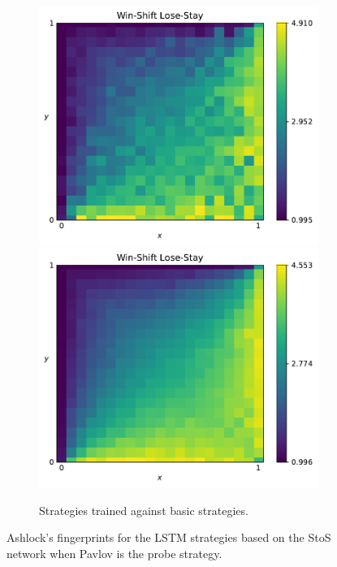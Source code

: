\begin{figure}[!htbp]
\begin{subfigure}{\textwidth}
        \includegraphics[width=.3\textwidth]{src/chapters/07/img/win_shift_lose_stay_basic_sequence_1.pdf}
        \includegraphics[width=.3\textwidth]{src/chapters/07/img/win_shift_lose_stay_basic_sequence_0_78.pdf}
        \caption{Strategies trained against basic strategies.}
    \end{subfigure}
    \caption{Ashlock's fingerprints for the LSTM strategies based on the StoS
    network when Pavlov is the probe strategy.}\label{fig:ashlock_fingerprints_pavlov_s_to_s}
\end{figure}

